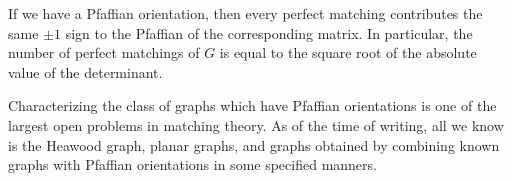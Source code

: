 \begin{fprop}
	If we have a Pfaffian orientation, then every perfect matching contributes the same $\pm 1$ sign to the Pfaffian of the corresponding matrix. In particular, the number of perfect matchings of $G$ is equal to the square root of the absolute value of the determinant.
\end{fprop}

Characterizing the class of graphs which have Pfaffian orientations is one of the largest open problems in matching theory. As of the time of writing, all we know is the Heawood graph, planar graphs, and graphs obtained by combining known graphs with Pfaffian orientations in some specified manners.

